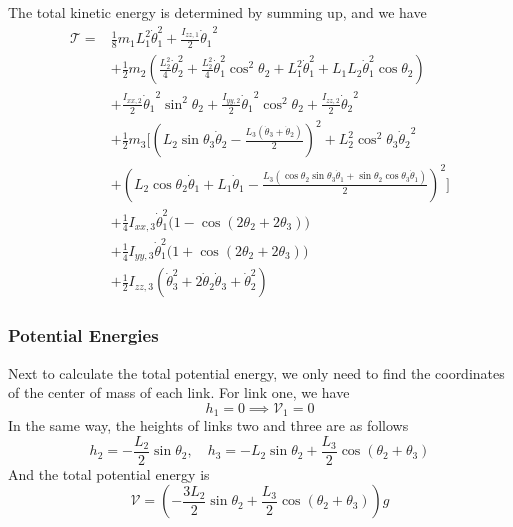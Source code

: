 \documentclass{article}
\begin{document}
The total kinetic energy is determined by summing up, and we have
\[
    \begin{aligned}
        \mathcal T = & \frac{1}{8} m_1 L_1^2 \dot\theta_1^2 + \frac{I_{zz,1}}{2} {\dot \theta_1}^2 \\
        & + \frac{1}{2} m_2 (\frac{L_2^2}{4} \dot \theta_2^2 + \frac{L_2^2}{4}\dot\theta_1^2 \cos^2 \theta_2 + L_1^2 \dot\theta_1^2 + L_1 L_2 \dot\theta_1^2 \cos\theta_2) \\
        & + \frac{I_{xx,2}}{2} {\dot\theta_1}^2 \sin^2\theta_2+ \frac{I_{yy,2}}{2} {\dot\theta_1}^2 \cos^2\theta_2 + \frac{I_{zz,2}}{2} {\dot\theta_2}^2\\
        & + \frac{1}{2} m_3 \Big[ {{\left( {L_2} \sin\theta_3 \dot\theta_2-\frac{{L_3} \left( \dot\theta_3+\dot\theta_2\right) }{2}\right) }^{2}}+{L_2^{2}} {{\cos^{2}\theta_3}} {{\dot\theta_2}^{2}} \\
        &+ {{\left( {L_2} \cos\theta_2 \dot\theta_1 + L_1 \dot \theta_1 -\frac{{L_3} \left( \cos\theta_2 \sin\theta_3 \dot\theta_1+\sin\theta_2 \cos\theta_3 \dot\theta_1\right) }{2}\right) }^{2}} \Big] \\
        &+ \frac{1}{4} I_{xx,3} \dot\theta_1^2 \big( 1 - \cos(2\theta_2 + 2\theta_3) \big) \\
        &+ \frac{1}{4} I_{yy,3} \dot\theta_1^2 \big( 1 + \cos(2\theta_2 + 2\theta_3) \big) \\
        &+ \frac{1}{2} I_{zz,3} (\dot\theta_3^2 + 2 \dot\theta_2 \dot\theta_3 + \dot\theta_2^2)
    \end{aligned}
\]

\subsubsection{Potential Energies}

Next to calculate the total potential energy, we only need to find the coordinates of the center of mass of each link.
For link one, we have
\[ h_1 = 0 \implies \mathcal V_1 = 0\]
In the same way, the heights of links two and three are as follows
\[
    h_2 = - \frac{L_2}{2} \sin \theta_2,\quad h_3 = - L_2 \sin \theta_2 + \frac{L_3}{2} \cos(\theta_2+\theta_3)
\]
And the total potential energy is
\[
    \mathcal V = (- \frac{3L_2}{2} \sin \theta_2 + \frac{L_3}{2} \cos(\theta_2+\theta_3))g
\]
\end{document}
